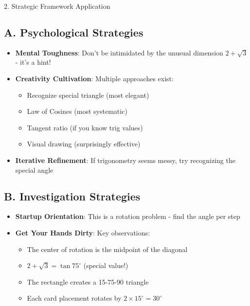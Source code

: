 \documentclass[12pt]{article}
\begin{document}
\begin{strategybox}{2. Strategic Framework Application}

\subsection*{A. Psychological Strategies}
\begin{itemize}[leftmargin=*]
    \item \textbf{Mental Toughness}: Don't be intimidated by the unusual dimension $2+\sqrt{3}$ - it's a hint!
    
    \item \textbf{Creativity Cultivation}: Multiple approaches exist:
    \begin{itemize}
        \item Recognize special triangle (most elegant)
        \item Law of Cosines (most systematic)
        \item Tangent ratio (if you know trig values)
        \item Visual drawing (surprisingly effective)
    \end{itemize}
    
    \item \textbf{Iterative Refinement}: If trigonometry seems messy, try recognizing the special angle
\end{itemize}

\subsection*{B. Investigation Strategies}
\begin{itemize}[leftmargin=*]
    \item \textbf{Startup Orientation}: This is a rotation problem - find the angle per step
    
    \item \textbf{Get Your Hands Dirty}: Key observations:
    \begin{itemize}
        \item The center of rotation is the midpoint of the diagonal
        \item $2+\sqrt{3} = \tan 75^\circ$ (special value!)
        \item The rectangle creates a 15-75-90 triangle
        \item Each card placement rotates by $2 \times 15^\circ = 30^\circ$
    \end{itemize}
    

\end{itemize}
\end{strategybox}
\end{document}

